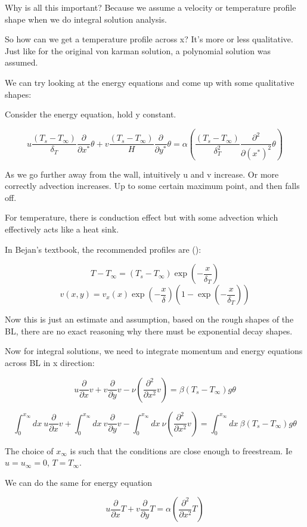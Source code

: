 \documentclass[11pt]{article}
\begin{document}
Why is all this important? Because we assume a velocity or temperature profile shape when we do integral solution analysis. 

So how can we get a temperature profile across x? It's more or less qualitative. Just like for the original von karman solution, a polynomial solution was assumed.

We can try looking at the energy equations and come up with some qualitative shapes:

Consider the energy equation, hold y constant. 

$$ u \frac{(T_s - T_\infty)}{\delta_T} \frac{\partial}{\partial x^*}\theta + v \frac{(T_s - T_\infty)}{H} \frac{\partial }{\partial y^*}  \theta  = \alpha ( \frac{(T_s - T_\infty)}{\delta_T^2} \frac{\partial^2}{\partial (x^*)^2} \theta ) $$ 


As we go further away from the wall, intuitively u and v increase. Or more correctly advection increases. Up to some certain maximum point, and then falls off.

For temperature, there is conduction effect but with some advection which effectively acts like a heat sink. 

In Bejan's textbook, the recommended profiles are (\cite{bejan2013convection}):

$$T-T_\infty = (T_s -T_\infty) \exp (-\frac{x}{\delta_T})$$
$$v (x,y) = v_x (x) \exp (-\frac{x}{\delta}) (1- \exp (-\frac{x}{\delta_T}))$$

Now this is just an estimate and assumption, based on the rough shapes of the BL, there are no exact reasoning why there must be exponential decay shapes. 

Now for integral solutions, we need to integrate momentum and energy equations across BL in x direction:

$$ u \frac{\partial}{\partial x} v +  v \frac{\partial}{\partial y} v  -\nu ( \frac{\partial^2}{\partial x^2} v ) = \beta(T_s-T_\infty) g \theta $$

$$ \int_0^{x_\infty}  dx\ u \frac{\partial}{\partial x} v  + \int_0^{x_\infty}  dx \  v \frac{\partial}{\partial y} v  - \int_0^{x_\infty}  dx \ \nu ( \frac{\partial^2}{\partial x^2} v ) =  \int_0^{x_\infty}  dx \ \beta(T_s-T_\infty) g \theta $$

The choice of $x_\infty$ is such that the conditions are close enough to freestream. Ie $u = u_\infty = 0 $, $T=T_\infty$.

We can do the same for energy equation

$$ u \frac{\partial}{\partial x} T + v  \frac{\partial }{\partial y}  T  = \alpha (  \frac{\partial^2}{\partial x^2} T ) $$ 
\end{document}
